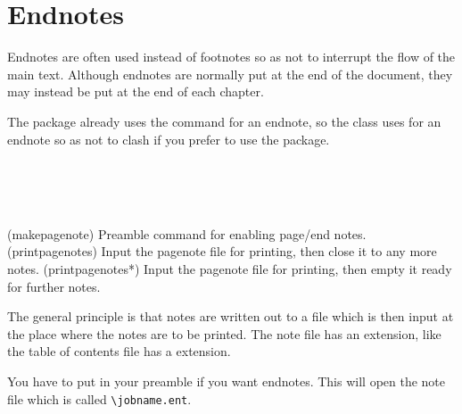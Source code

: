 \documentclass[10pt,a4paper,extrafontsizes]{memoir}
\newcommand{\LMnote}[2]{}
\begin{document}
\LMnote{2013/05/02}{Moved here from backmatter.tex}

\section{Endnotes}
\label{sec:endnotes}

\LMnote{2010/10/28}{several \cs{printpagenotes} was spelled wrong}



    Endnotes are often used instead of footnotes so as not to interrupt the
flow of the main text. Although endnotes are normally put at the end of 
the document, they may instead be put at the end of each chapter.

    The  package already uses the command \cmd{\endnote} for
an endnote, so the class uses \cmd{\pagenote} for an endnote so as not 
to clash if you prefer to use the package. 
\LMnote{2011/01/23}{The implementation has nothing to do with the
  current pagenote package, thus the remark is removed}

\begin{syntax}
\cmd{\makepagenote} \\
\cmd{\pagenote} \\
\cmd{\printpagenotes} \cmd{\printpagenotes*} \\
\end{syntax}
\glossary(makepagenote)%
  {}%
  {Preamble command for enabling page/end notes.}%
\glossary(printpagenotes)%
  {}%
  {Input the pagenote  file for printing, then close it to any 
   more notes.}%
\glossary(printpagenotes*)%
  {}%
  {Input the pagenote  file for printing, then empty it ready for 
   further notes.}%

   The general principle is that notes are written out to a file which
is then input at the place where the notes are to be printed. The note 
file has an  extension, like the table of contents file
has a  extension.

    You have to put \cmd{\makepagenote} in your preamble if you want 
endnotes. This will open the  note file which is called
\verb?\jobname.ent?.
\end{document}
